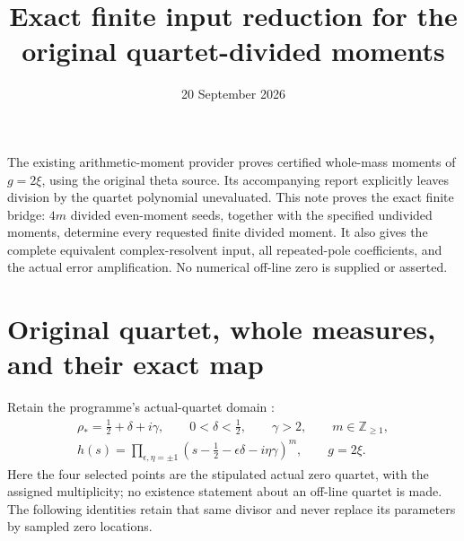 \documentclass[11pt]{article}
\title{Exact finite input reduction for the original quartet-divided moments}
\author{}\date{20 September 2026}
\begin{document}
\maketitle

The existing arithmetic-moment provider \cite{AM} proves certified
whole-mass moments of \(g=2\xi\), using the original theta source.
Its accompanying report explicitly leaves division by the quartet
polynomial unevaluated. This note proves the exact finite bridge:
\(4m\) divided even-moment seeds, together with the specified
undivided moments, determine every requested finite divided moment.
It also gives the complete equivalent complex-resolvent input,
all repeated-pole coefficients, and the actual error amplification.
No numerical off-line zero is supplied or asserted.

\section{Original quartet, whole measures, and their exact map}

Retain the programme's actual-quartet domain \cite{MI}:
\begin{equation}\tag{QS1}
\begin{gathered}
 \rho_*=\tfrac12+\delta+i\gamma,\qquad
 0<\delta<\tfrac12,\qquad \gamma>2,\qquad m\in\mathbb Z_{\ge1},\\
 h(s)=\prod_{\epsilon,\eta=\pm1}
       (s-\tfrac12-\epsilon\delta-i\eta\gamma)^m,\qquad g=2\xi .
\end{gathered}
\end{equation}
Here the four selected points are the stipulated actual zero
quartet, with the assigned multiplicity; no existence statement
about an off-line quartet is made. The following identities retain
that same divisor and never replace its parameters by sampled
zero locations.
\end{document}
